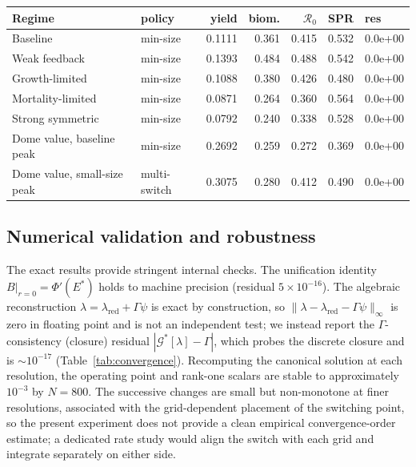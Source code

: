 \documentclass[pdflatex,sn-mathphys-num]{sn-jnl}
\theoremstyle{plain}
\theoremstyle{definition}
\theoremstyle{remark}
\begin{document}
\begin{table}[t]
\begin{tabular}{llrrrrl}
\toprule
Regime & policy & yield & biom. & $\mathcal R_0$ & SPR & res \\
\midrule
Baseline & min-size & 0.1111 & 0.361 & 0.415 & 0.532 & 0.0e+00 \\
Weak feedback & min-size & 0.1393 & 0.484 & 0.488 & 0.542 & 0.0e+00 \\
Growth-limited & min-size & 0.1088 & 0.380 & 0.426 & 0.480 & 0.0e+00 \\
Mortality-limited & min-size & 0.0871 & 0.264 & 0.360 & 0.564 & 0.0e+00 \\
Strong symmetric & min-size & 0.0792 & 0.240 & 0.338 & 0.528 & 0.0e+00 \\
Dome value, baseline peak & min-size & 0.2692 & 0.259 & 0.272 & 0.369 & 0.0e+00 \\
Dome value, small-size peak & multi-switch & 0.3075 & 0.280 & 0.412 & 0.490 & 0.0e+00 \\
\bottomrule
\end{tabular}
\end{table}

\subsection{Numerical validation and robustness}
\label{subsec:validation}

The exact results provide stringent internal checks. The unification identity
$B|_{r=0}=\Phi'(E^*)$ holds to machine precision (residual $5\times10^{-16}$). The
algebraic reconstruction $\lambda=\lambda_{\mathrm{red}}+\Gamma\psi$ is exact by
construction, so $\|\lambda-\lambda_{\mathrm{red}}-\Gamma\psi\|_\infty$ is zero in
floating point and is not an independent test; we instead report the
$\Gamma$-consistency (closure) residual $|\mathcal G^*[\lambda]-\Gamma|$,
which probes the discrete closure and is $\sim10^{-17}$
(Table~\ref{tab:convergence}). Recomputing the canonical solution at each
resolution, the operating point and rank-one scalars are stable to approximately
$10^{-3}$ by $N=800$. The successive changes are small but non-monotone at finer
resolutions, associated with the grid-dependent placement of the switching point,
so the present experiment does not provide a clean empirical convergence-order
estimate; a dedicated rate study would align the switch with each grid and
integrate separately on either side.
\end{document}
